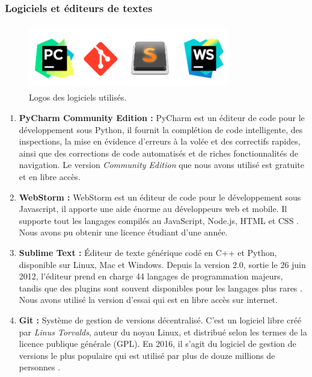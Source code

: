        \subsubsection{Logiciels et éditeurs de textes}
            \begin{figure}[H]
                    \centering
                    \includegraphics[height=80pt,width=250pt]{img/chapter4/tools/software.png}
                    \caption{Logos des logiciels utilisés.}
                    \label{}
            \end{figure}
            \begin{enumerate}[leftmargin=*]
                \item{\textbf{PyCharm Community Edition : }}
                PyCharm est un éditeur de code pour le développement sous Python, il fournit la complétion de code intelligente, des inspections, la mise en évidence d'erreurs à la volée et des correctifs rapides, ainsi que des corrections de code automatisés et de riches fonctionnalités de navigation.\cite{pycharm} Le version \emph{Community Edition} que nous avons utilisé est gratuite et en libre accès.\\

                \item{\textbf{WebStorm : }}
                WebStorm est un éditeur de code pour le développement sous Javascript, il apporte une aide énorme au développeurs web et mobile. Il supporte tout les langages compilés au JavaScript, Node.js, HTML et CSS \cite{webstorm}. Nous avons pu obtenir une licence étudiant d'une année.\\

                \item{\textbf{Sublime Text : }}
                Éditeur de texte générique codé en C++ et Python, disponible sur Linux, Mac et Windows. Depuis la version 2.0, sortie le 26 juin 2012, l'éditeur prend en charge 44 langages de programmation majeurs, tandis que des plugins sont souvent disponibles pour les langages plus rares \cite{sublime}. Nous avons utilisé la version d’essai qui est en libre accès sur internet.\\

                \item{\textbf{Git : }}
                Système de gestion de versions décentralisé. C'est un logiciel libre créé par \emph{Linus Torvalds}, auteur du noyau Linux, et distribué selon les termes de la licence publique générale (GPL). En 2016, il s’agit du logiciel de gestion de versions le plus populaire qui est utilisé par plus de douze millions de personnes \cite{git}.
            \end{enumerate}

